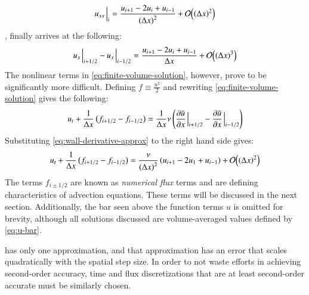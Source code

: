 \begin{equation}
	\label{eq:spatial-finite-difference-2nd-derivative}
	u_{xx}\eval_i=\frac{u_{i+1}-2u_i+u_{i-1}}{\left( \Delta x \right)^2}+\order{\left(\Delta x \right)^2}
\end{equation}
, finally arrives at the following:
\begin{equation}
	\label{eq:wall-derivative-approx}
	u_x\eval_{i+1/2}-u_x\eval_{i-1/2}=\frac{u_{i+1}-2u_i+u_{i-1}}{\Delta x}+\order{ (\Delta x)^3}
\end{equation}
The nonlinear terms in \cref{eq:finite-volume-solution}, however, prove to be significantly more difficult.
Defining $f\equiv\frac{u^2}{2}$ and rewriting \cref{eq:finite-volume-solution} gives the following:
\begin{equation}
	\label{eq:burgers-equation-with-fluxes}
	u_t + \frac{1}{\Delta x}\left( f_{i+1/2}-f_{i-1/2} \right)=\frac{1}{\Delta x}\nu \left( \pdv{\bar{u}}{x}\eval_{i+1/2}-\pdv{\bar{u}}{x}\eval_{i-1/2} \right)
\end{equation}
Substituting \cref{eq:wall-derivative-approx} to the right hand side gives:
\begin{equation}
	\label{eq:burgers-eq-central-diff}
	u_t + \frac{1}{\Delta x}\left( f_{i+1/2}-f_{i-1/2} \right)=\frac{\nu }{\left( \Delta x \right)^2}\left( u_{i+1}-2u_1+u_{i-1} \right)+\order{\left( \Delta x\right)^2 }
\end{equation}
The terms $f_{i\pm 1/2}$ are known as \textit{numerical flux} terms and are defining characteristics of advection equations.
These terms will be discussed in the next section.
Additionally, the bar seen above the function terms $u$ is omitted for brevity, although all solutions discussed are volume-averaged values defined by \cref{eq:u-bar}.

 has only one approximation, and that approximation has an error that scales quadratically with the spatial step size.
In order to not waste efforts in achieving second-order accuracy, time and flux discretizations that are at least second-order accurate must be similarly chosen.